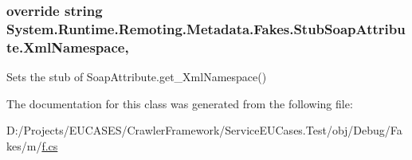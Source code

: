 \hypertarget{class_system_1_1_runtime_1_1_remoting_1_1_metadata_1_1_fakes_1_1_stub_soap_attribute_a0a0770d05f9004830da2f28b41ce2d1a}{
\subsubsection[{Xml\-Namespace}]{\setlength{\rightskip}{0pt plus 5cm}override string System.\-Runtime.\-Remoting.\-Metadata.\-Fakes.\-Stub\-Soap\-Attribute.\-Xml\-Namespace\hspace{0.3cm}{\ttfamily [get]}, {\ttfamily [set]}}}\label{class_system_1_1_runtime_1_1_remoting_1_1_metadata_1_1_fakes_1_1_stub_soap_attribute_a0a0770d05f9004830da2f28b41ce2d1a}


Sets the stub of Soap\-Attribute.\-get\-\_\-\-Xml\-Namespace()



The documentation for this class was generated from the following file\-:\begin{DoxyCompactItemize}
\item 
D\-:/\-Projects/\-E\-U\-C\-A\-S\-E\-S/\-Crawler\-Framework/\-Service\-E\-U\-Cases.\-Test/obj/\-Debug/\-Fakes/m/\hyperlink{m_2f_8cs}{f.\-cs}\end{DoxyCompactItemize}
